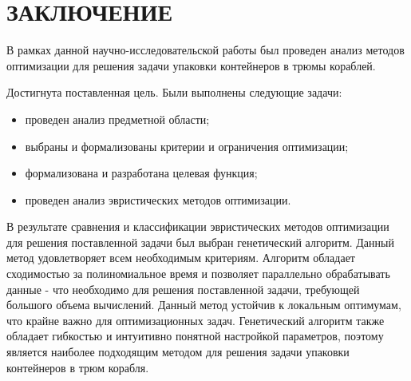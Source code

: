 \chapter*{\hfill{\centering ЗАКЛЮЧЕНИЕ}\hfill}

В рамках данной научно-исследовательской работы был проведен анализ методов оптимизации для решения задачи упаковки контейнеров в трюмы кораблей.

Достигнута поставленная цель. Были выполнены следующие задачи:
\begin{itemize}
	\item проведен анализ предметной области;
	\item выбраны и формализованы критерии и ограничения оптимизации;
	\item формализована и разработана целевая функция;
	\item проведен анализ эвристических методов оптимизации.  
\end{itemize}

В результате сравнения и классификации эвристических методов оптимизации для решения поставленной задачи был выбран генетический алгоритм. Данный метод удовлетворяет всем необходимым критериям. Алгоритм обладает сходимостью за полиномиальное время и позволяет параллельно обрабатывать данные - что необходимо для решения поставленной задачи, требующей большого объема вычислений.
Данный метод устойчив к локальным оптимумам, что крайне важно для оптимизационных задач. Генетический алгоритм также обладает гибкостью и интуитивно понятной настройкой параметров, поэтому является наиболее подходящим методом для решения задачи упаковки контейнеров в трюм корабля.